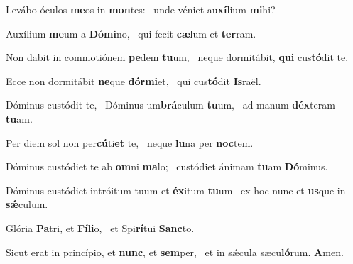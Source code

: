 \item Levábo óculos \textbf{me}os in \textbf{mon}tes:~\psstar{} unde véniet au\textbf{xí}lium \textbf{mi}hi?

\item Auxílium \textbf{me}um a \textbf{Dó}\textbf{mi}no,~\psstar{} qui fecit \textbf{cæ}lum et \textbf{ter}ram.

\item Non dabit in commotiónem \textbf{pe}dem \textbf{tu}um,~\psstar{} neque dormitábit, \textbf{qui} cus\textbf{tó}dit te.

\item Ecce non dormitábit \textbf{ne}que \textbf{dór}\textbf{mi}et,~\psstar{} qui cus\textbf{tó}dit \textbf{Is}raël.

\item Dóminus custódit te,~\pscross{} Dóminus um\textbf{brá}culum \textbf{tu}um,~\psstar{} ad manum \textbf{déx}teram \textbf{tu}am.

\item Per diem sol non per\textbf{cú}ti\textbf{et} te,~\psstar{} neque \textbf{lu}na per \textbf{noc}tem.

\item Dóminus custódiet te ab \textbf{om}ni \textbf{ma}lo;~\psstar{} custódiet ánimam \textbf{tu}am \textbf{Dó}minus.

\item Dóminus custódiet intróitum tuum et \textbf{éx}itum \textbf{tu}um~\psstar{} ex hoc nunc et \textbf{us}que in \textbf{sǽ}culum.

\item Glória \textbf{Pa}tri, et \textbf{Fí}\textbf{li}o,~\psstar{} et Spi\textbf{rí}tui \textbf{Sanc}to.

\item Sicut erat in princípio, et \textbf{nunc}, et \textbf{sem}per,~\psstar{} et in sǽcula sæcu\textbf{ló}rum. \textbf{A}men.